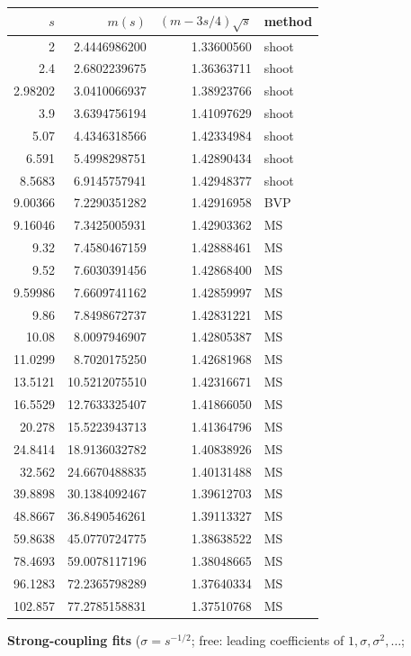 \begin{center}\small\begin{tabular}{rrrl}\toprule $s$ & $m(s)$ & $(m-3s/4)\sqrt s$ & method\\\midrule
2 & 2.4446986200 & 1.33600560 & shoot\\
2.4 & 2.6802239675 & 1.36363711 & shoot\\
2.98202 & 3.0410066937 & 1.38923766 & shoot\\
3.9 & 3.6394756194 & 1.41097629 & shoot\\
5.07 & 4.4346318566 & 1.42334984 & shoot\\
6.591 & 5.4998298751 & 1.42890434 & shoot\\
8.5683 & 6.9145757941 & 1.42948377 & shoot\\
9.00366 & 7.2290351282 & 1.42916958 & BVP\\
9.16046 & 7.3425005931 & 1.42903362 & MS\\
9.32 & 7.4580467159 & 1.42888461 & MS\\
9.52 & 7.6030391456 & 1.42868400 & MS\\
9.59986 & 7.6609741162 & 1.42859997 & MS\\
9.86 & 7.8498672737 & 1.42831221 & MS\\
10.08 & 8.0097946907 & 1.42805387 & MS\\
11.0299 & 8.7020175250 & 1.42681968 & MS\\
13.5121 & 10.5212075510 & 1.42316671 & MS\\
16.5529 & 12.7633325407 & 1.41866050 & MS\\
20.278 & 15.5223943713 & 1.41364796 & MS\\
24.8414 & 18.9136032782 & 1.40838926 & MS\\
32.562 & 24.6670488835 & 1.40131488 & MS\\
39.8898 & 30.1384092467 & 1.39612703 & MS\\
48.8667 & 36.8490546261 & 1.39113327 & MS\\
59.8638 & 45.0770724775 & 1.38638522 & MS\\
78.4693 & 59.0078117196 & 1.38048665 & MS\\
96.1283 & 72.2365798289 & 1.37640334 & MS\\
102.857 & 77.2785158831 & 1.37510768 & MS\\
\bottomrule\end{tabular}\end{center}
\textbf{Strong-coupling fits} ($\sigma=s^{-1/2}$; free: leading coefficients of $1,\sigma,\sigma^2,\dots$;
